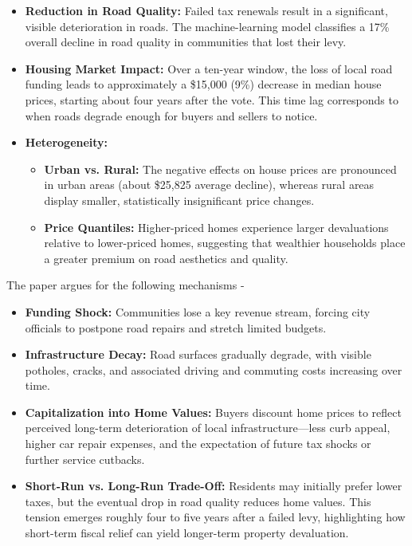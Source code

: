 \begin{itemize}
    \item {\bf Reduction in Road Quality:} Failed tax renewals result in a significant, visible deterioration in roads. The machine-learning model classifies a 17\% overall decline in road quality in communities that lost their levy.
    \item {\bf Housing Market Impact:} Over a ten-year window, the loss of local road funding leads to approximately a \$15,000 (9\%) decrease in median house prices, starting about four years after the vote. This time lag corresponds to when roads degrade enough for buyers and sellers to notice.
    \item {\bf Heterogeneity:}
    \begin{itemize}
        \item {\bf Urban vs. Rural:} The negative effects on house prices are pronounced in urban areas (about \$25,825 average decline), whereas rural areas display smaller, statistically insignificant price changes.
        \item {\bf Price Quantiles:} Higher-priced homes experience larger devaluations relative to lower-priced homes, suggesting that wealthier households place a greater premium on road aesthetics and quality.
    \end{itemize}
\end{itemize}

 The paper argues for the following mechanisms -

\begin{itemize}
    \item {\bf Funding Shock:} Communities lose a key revenue stream, forcing city officials to postpone road repairs and stretch limited budgets.
    \item {\bf Infrastructure Decay:} Road surfaces gradually degrade, with visible potholes, cracks, and associated driving and commuting costs increasing over time.
    \item {\bf Capitalization into Home Values:} Buyers discount home prices to reflect perceived long-term deterioration of local infrastructure—less curb appeal, higher car repair expenses, and the expectation of future tax shocks or further service cutbacks.
    \item {\bf Short-Run vs. Long-Run Trade-Off:} Residents may initially prefer lower taxes, but the eventual drop in road quality reduces home values. This tension emerges roughly four to five years after a failed levy, highlighting how short-term fiscal relief can yield longer-term property devaluation.
\end{itemize}



